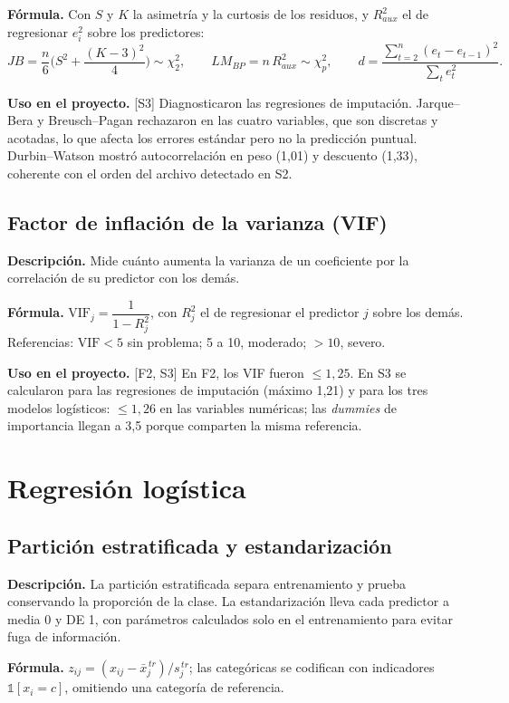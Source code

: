 \documentclass[11pt,a4paper]{article}
\newcommand{\desc}{\textbf{Descripción.} }
\newcommand{\formula}{\textbf{Fórmula.} }
\newcommand{\uso}{\textbf{Uso en el proyecto.} }
\newcommand{\fase}[1]{{\footnotesize\color{gris}[#1]}}
\begin{document}
\formula Con $S$ y $K$ la asimetría y la curtosis de los residuos, y $R^2_{aux}$ el de regresionar $e_i^2$ sobre los predictores:
\[
JB=\frac n6\Big(S^2+\frac{(K-3)^2}{4}\Big)\sim\chi^2_2,\qquad LM_{BP}=n\,R^2_{aux}\sim\chi^2_p,\qquad d=\frac{\sum_{t=2}^n(e_t-e_{t-1})^2}{\sum_t e_t^2} .
\]

\uso \fase{S3} Diagnosticaron las regresiones de imputación. Jarque--Bera y Breusch--Pagan rechazaron en las cuatro variables, que son discretas y acotadas, lo que afecta los errores estándar pero no la predicción puntual. Durbin--Watson mostró autocorrelación en peso (1,01) y descuento (1,33), coherente con el orden del archivo detectado en S2.

\subsection{Factor de inflación de la varianza (VIF)}
\desc Mide cuánto aumenta la varianza de un coeficiente por la correlación de su predictor con los demás.

\formula $\mathrm{VIF}_j=\dfrac1{1-R_j^2}$, con $R_j^2$ el de regresionar el predictor $j$ sobre los demás. Referencias: $\mathrm{VIF}<5$ sin problema; 5 a 10, moderado; $>10$, severo.

\uso \fase{F2, S3} En F2, los VIF fueron $\le1{,}25$. En S3 se calcularon para las regresiones de imputación (máximo 1,21) y para los tres modelos logísticos: $\le1{,}26$ en las variables numéricas; las \emph{dummies} de importancia llegan a 3,5 porque comparten la misma referencia.

\section{Regresión logística}\label{sec:logistica}

\subsection{Partición estratificada y estandarización}
\desc La partición estratificada separa entrenamiento y prueba conservando la proporción de la clase. La estandarización lleva cada predictor a media 0 y DE 1, con parámetros calculados solo en el entrenamiento para evitar fuga de información.

\formula $z_{ij}=(x_{ij}-\bar x_j^{\,tr})/s_j^{\,tr}$; las categóricas se codifican con indicadores $\mathbb 1[x_i=c]$, omitiendo una categoría de referencia.
\end{document}
